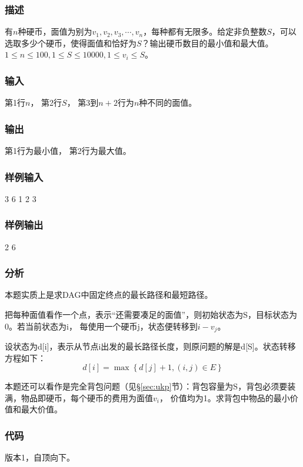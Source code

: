 \subsubsection{描述}
有$n$种硬币，面值为别为$v_1,v_2,v_3,\cdots, v_n$，每种都有无限多。给定非负整数$S$，可以
选取多少个硬币，使得面值和恰好为$S$？输出硬币数目的最小值和最大值。
$1 \leq n \leq 100, 1 \leq S \leq 10000, 1 \leq v_i \leq S$。

\subsubsection{输入}
第1行$n$，
第2行$S$，
第3到$n+2$行为$n$种不同的面值。

\subsubsection{输出}
第1行为最小值，
第2行为最大值。

\subsubsection{样例输入}
\begin{Code}
3
6
1
2
3
\end{Code}

\subsubsection{样例输出}
\begin{Code}
2
6
\end{Code}

\subsubsection{分析}
本题实质上是求DAG中固定终点的最长路径和最短路径。

把每种面值看作一个点，表示“还需要凑足的面值”，则初始状态为S，目标状态为0。若当前状态为i，
每使用一个硬币j，状态便转移到$i-v_j$。

设状态为d[i]，表示从节点i出发的最长路径长度，则原问题的解是d[S]。状态转移方程如下：
$$d[i]=\max\left\{d[j]+1,(i,j) \in E\right\}$$

本题还可以看作是完全背包问题（见\S \ref{sec:ukp}节）：背包容量为S，背包必须要装满，物品即硬币，每个硬币的费用为面值$v_i$，
价值均为1。求背包中物品的最小价值和最大价值。

\subsubsection{代码}
版本1，自顶向下。

